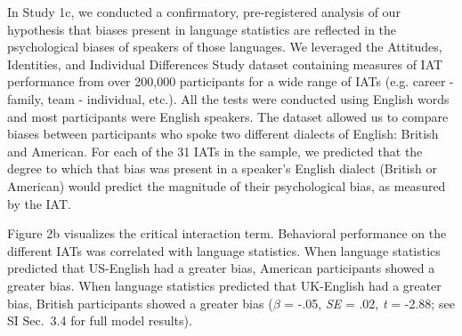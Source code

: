 \documentclass[9pt,twocolumn,twoside,lineno]{pnas-new}
\begin{document}
In Study 1c, we conducted a confirmatory, pre-registered analysis of our hypothesis that biases present in language statistics are reflected in the psychological biases of speakers of those languages. We leveraged the Attitudes, Identities, and Individual Differences Study dataset \citep[AIID,][]{aiid} containing measures of IAT performance from over 200,000 participants for a wide range of IATs (e.g. career - family, team - individual, etc.). All the tests were conducted using English words and most participants were English speakers. The dataset allowed us to compare biases between participants who spoke two different dialects of English: British and American. For each of the 31 IATs in the sample, we predicted that the degree to which that bias was present in a speaker’s English dialect (British or American) would predict the magnitude of their psychological bias, as measured by the IAT.



Figure 2b visualizes the critical interaction term. Behavioral performance on the different IATs was correlated with language statistics. When language statistics predicted that US-English had a greater bias, American participants showed a greater bias. When language statistics predicted that UK-English had a greater bias, British participants showed a greater bias (\(\beta\) = -.05, \emph{SE} = .02, \emph{t} = -2.88; see SI Sec.\ 3.4 for full model results).
\end{document}

